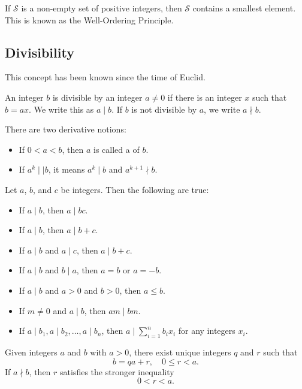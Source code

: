 \documentclass[11pt]{article}
\begin{document}
\begin{fact}
	If \(\mathcal{S}\) is a non-empty set of positive integers, then \(\mathcal{S}\) contains a smallest element. This is known as the Well-Ordering Principle.
\end{fact}

\subsection{Divisibility}
This concept has been known since the time of Euclid.

\begin{definition}
	An integer $b$ is divisible by an integer $a \neq 0$ if there is an integer $x$ such that $b = ax$. We write this as $a \mid b$. If $b$ is not divisible by $a$, we write $a \nmid b$.
\end{definition}

There are two derivative notions:
\begin{itemize}
	\item If $0 < a < b$, then $a$ is called a  of $b$.
	\item If $a^k \mid\mid b$, it means $a^k \mid b$ and $a^{k + 1} \nmid b$.
\end{itemize}

\begin{theorem}\label{1.1}
	Let $a$, $b$, and $c$ be integers. Then the following are true:
	\begin{itemize}
		\item If $a \mid b$, then $a \mid bc$.
		\item If $a \mid b$, then $a \mid b + c$.
		\item If $a \mid b$ and $a \mid c$, then $a \mid b + c$.
		\item If $a \mid b$ and $b \mid a$, then $a = b$ or $a = -b$.
		\item If $a \mid b$ and $a > 0$ and $b > 0$, then $a \leq b$.
		\item If $m \neq 0$ and $a \mid b$, then $am \mid bm$.
		\item If $a \mid b_1, a \mid b_2, \ldots, a \mid b_n$, then $a \mid \sum_{i=1}^{n}
			      b_i x_i$ for any integers $x_i$.
	\end{itemize}
\end{theorem}

\begin{theorem}\label{1.2}
	Given integers \(a\) and \(b\) with \(a > 0\), there exist unique integers \(q\) and \(r\) such that
	\[
		b = qa + r, \quad 0 \leq r < a.
	\]
	If \(a \nmid b\), then \(r\) satisfies the stronger inequality
	\[
		0 < r < a.
	\]
\end{theorem}
\end{document}

